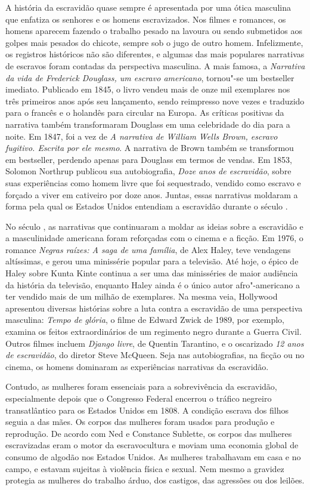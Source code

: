 A história da escravidão quase sempre é apresentada por uma ótica
masculina que enfatiza os senhores e os homens escravizados. Nos filmes
e romances, os homens aparecem fazendo o trabalho pesado na lavoura ou
sendo submetidos aos golpes mais pesados do chicote, sempre sob o jugo
de outro homem. Infelizmente, os registros históricos não são
diferentes, e algumas das mais populares narrativas de escravos foram
contadas da perspectiva masculina. A mais famosa, a \emph{Narrativa da
vida de Frederick Douglass, um escravo americano}, tornou"-se um
bestseller imediato. Publicado em 1845, o livro vendeu mais de onze mil
exemplares nos três primeiros anos após seu lançamento, sendo reimpresso
nove vezes e traduzido para o francês e o holandês para circular na
Europa. As críticas positivas da narrativa também transformaram Douglass
em uma celebridade do dia para a noite. Em 1847, foi a vez de \emph{A
narrativa de William Wells Brown, escravo fugitivo. Escrita por ele mesmo}. A narrativa de Brown também se transformou em bestseller,
perdendo apenas para Douglass em termos de vendas. Em 1853, Solomon
Northrup publicou sua autobiografia, \emph{Doze anos de escravidão},
sobre suas experiências como homem livre que foi sequestrado, vendido
como escravo e forçado a viver em cativeiro por doze anos. Juntas, essas
narrativas moldaram a forma pela qual os Estados Unidos entendiam a escravidão
durante o século .

No século , as narrativas que continuaram a moldar as ideias sobre a
escravidão e a masculinidade americana foram reforçadas com o cinema e a
ficção. Em 1976, o romance \emph{Negras raízes: A saga de uma família},
de Alex Haley, teve vendagens altíssimas, e gerou uma minissérie popular para a
televisão. Até hoje, o épico de Haley sobre Kunta Kinte continua a ser
uma das minisséries de maior audiência da história da televisão,
enquanto Haley ainda é o único autor afro"-americano a ter vendido mais
de um milhão de exemplares. Na mesma veia, Hollywood apresentou diversas
histórias sobre a luta contra a escravidão de uma perspectiva masculina:
\emph{Tempo de glória}, o filme de Edward Zwick de 1989, por exemplo,
examina os feitos extraordinários de um regimento negro durante a Guerra
Civil. Outros filmes incluem \emph{Django livre}, de Quentin Tarantino,
e o oscarizado \emph{12 anos de escravidão}, do diretor Steve McQueen.
Seja nas autobiografias, na ficção ou no cinema, os homens dominaram as
experiências narrativas da escravidão.

Contudo, as mulheres foram essenciais para a sobrevivência da
escravidão, especialmente depois que o Congresso Federal encerrou o
tráfico negreiro transatlântico para os Estados Unidos em 1808. A
condição escrava dos filhos seguia a das mães. Os corpos das mulheres
foram usados para produção e reprodução. De acordo com Ned e Constance
Sublette, os corpos das mulheres escravizadas eram o motor da
escravocultura e moviam uma economia global de consumo de algodão nos
Estados Unidos. As mulheres trabalhavam em casa e no
campo, e estavam sujeitas à violência física e sexual. Nem mesmo a
gravidez protegia as mulheres do trabalho árduo, dos castigos, das
agressões ou dos leilões.

